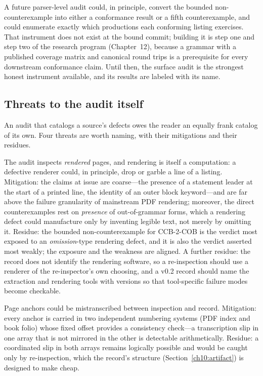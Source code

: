 \begin{remark}\label{ch10:parser-audit}
A future parser-level audit could, in principle, convert the bounded non-counterexample into either a conformance result or a fifth counterexample, and could enumerate exactly which productions each conforming listing exercises. That instrument does not exist at the bound commit; building it is step one and step two of the research program (Chapter~12), because a grammar with a published coverage matrix and canonical round trips is a prerequisite for every downstream conformance claim. Until then, the surface audit is the strongest honest instrument available, and its results are labeled with its name.
\end{remark}

\subsection{Threats to the audit itself}\label{ch10:method-threats}

An audit that catalogs a source's defects owes the reader an equally frank catalog of its own. Four threats are worth naming, with their mitigations and their residues.

\begin{threat}\label{ch10:threat-render}
The audit inspects \emph{rendered} pages, and rendering is itself a computation: a defective renderer could, in principle, drop or garble a line of a listing. Mitigation: the claims at issue are coarse---the presence of a statement leader at the start of a printed line, the identity of an outer block keyword---and are far above the failure granularity of mainstream PDF rendering; moreover, the direct counterexamples rest on \emph{presence} of out-of-grammar forms, which a rendering defect could manufacture only by inventing legible text, not merely by omitting it. Residue: the bounded non-counterexample for CCB-2-COB is the verdict most exposed to an \emph{omission}-type rendering defect, and it is also the verdict asserted most weakly; the exposure and the weakness are aligned. A further residue: the record does not identify the rendering software, so a re-inspection should use a renderer of the re-inspector's own choosing, and a v0.2 record should name the extraction and rendering tools with versions so that tool-specific failure modes become checkable.
\end{threat}

\begin{threat}\label{ch10:threat-anchor}
Page anchors could be mistranscribed between inspection and record. Mitigation: every anchor is carried in two independent numbering systems (PDF index and book folio) whose fixed offset provides a consistency check---a transcription slip in one array that is not mirrored in the other is detectable arithmetically. Residue: a coordinated slip in both arrays remains logically possible and would be caught only by re-inspection, which the record's structure (Section~\ref{ch10:artifact}) is designed to make cheap.
\end{threat}

